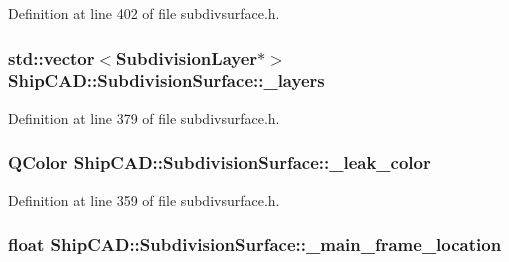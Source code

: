 Definition at line 402 of file subdivsurface.\-h.

\hypertarget{classShipCAD_1_1SubdivisionSurface_a87c6c8b63f203d788b8f4b361c814c96}{
\subsubsection[{\-\_\-layers}]{\setlength{\rightskip}{0pt plus 5cm}std\-::vector$<${\bf Subdivision\-Layer}$\ast$$>$ Ship\-C\-A\-D\-::\-Subdivision\-Surface\-::\-\_\-layers\hspace{0.3cm}{\ttfamily [protected]}}}\label{classShipCAD_1_1SubdivisionSurface_a87c6c8b63f203d788b8f4b361c814c96}


Definition at line 379 of file subdivsurface.\-h.

\hypertarget{classShipCAD_1_1SubdivisionSurface_aacd1616b97a4425cc9b1051e01785596}{
\subsubsection[{\-\_\-leak\-\_\-color}]{\setlength{\rightskip}{0pt plus 5cm}Q\-Color Ship\-C\-A\-D\-::\-Subdivision\-Surface\-::\-\_\-leak\-\_\-color\hspace{0.3cm}{\ttfamily [protected]}}}\label{classShipCAD_1_1SubdivisionSurface_aacd1616b97a4425cc9b1051e01785596}


Definition at line 359 of file subdivsurface.\-h.

\hypertarget{classShipCAD_1_1SubdivisionSurface_a3ea08aa45ad221a1b485010ce5e8dee7}{
\subsubsection[{\-\_\-main\-\_\-frame\-\_\-location}]{\setlength{\rightskip}{0pt plus 5cm}float Ship\-C\-A\-D\-::\-Subdivision\-Surface\-::\-\_\-main\-\_\-frame\-\_\-location\hspace{0.3cm}{\ttfamily [protected]}}}\label{classShipCAD_1_1SubdivisionSurface_a3ea08aa45ad221a1b485010ce5e8dee7}


